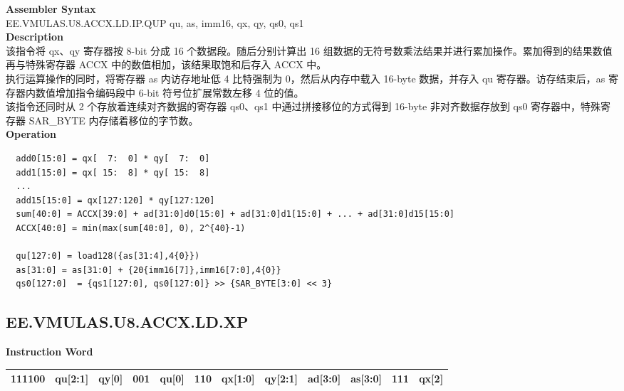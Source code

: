 \textbf{Assembler Syntax} \\
EE.VMULAS.U8.ACCX.LD.IP.QUP qu, as, imm16, qx, qy, qs0, qs1 \\
\textbf{Description} \\
该指令将 qx、qy 寄存器按 8-bit 分成 16 个数据段。随后分别计算出 16 组数据的无符号数乘法结果并进行累加操作。累加得到的结果数值再与特殊寄存器 ACCX 中的数值相加，该结果取饱和后存入 ACCX 中。\\
执行运算操作的同时，将寄存器 as 内访存地址低 4 比特强制为 0，然后从内存中载入 16-byte 数据，并存入 qu 寄存器。访存结束后，as 寄存器内数值增加指令编码段中 6-bit 符号位扩展常数左移 4 位的值。\\
该指令还同时从 2 个存放着连续对齐数据的寄存器 qs0、qs1 中通过拼接移位的方式得到 16-byte 非对齐数据存放到 qs0 寄存器中，特殊寄存器 SAR\_BYTE 内存储着移位的字节数。\\
\textbf{Operation}
\begin{lstlisting}
  add0[15:0] = qx[  7:  0] * qy[  7:  0]
  add1[15:0] = qx[ 15:  8] * qy[ 15:  8]
  ...
  add15[15:0] = qx[127:120] * qy[127:120]
  sum[40:0] = ACCX[39:0] + ad[31:0]d0[15:0] + ad[31:0]d1[15:0] + ... + ad[31:0]d15[15:0]
  ACCX[40:0] = min(max(sum[40:0], 0), 2^{40}-1)

  qu[127:0] = load128({as[31:4],4{0}})
  as[31:0] = as[31:0] + {20{imm16[7]},imm16[7:0],4{0}}
  qs0[127:0]  = {qs1[127:0], qs0[127:0]} >> {SAR_BYTE[3:0] << 3}
\end{lstlisting}

\clearpage
\subsection{EE.VMULAS.U8.ACCX.LD.XP}\label{instruction:EEVMULASU8ACCXLDXP}
\setlength\tabcolsep{6pt}
\textbf{Instruction Word} \\
\begin{tabular}{|c|c|c|c|c|c|c|c|c|c|c|c|}
	\hline
	111100 & qu[2:1] & qy[0] & 001 & qu[0] & 110 & qx[1:0] & qy[2:1] & ad[3:0] & as[3:0] & 111 & qx[2] \\
	\hline
\end{tabular}

